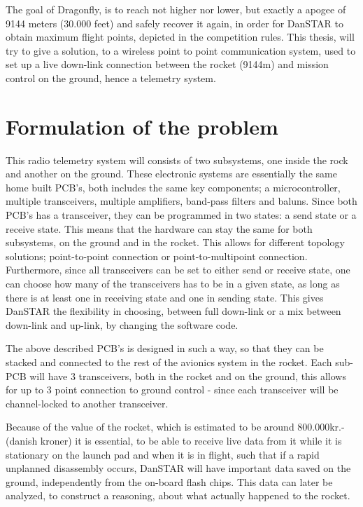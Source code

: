 
The goal of Dragonfly, is to reach not higher nor lower, but exactly a apogee of 9144 meters (30.000 feet) and safely recover it again, in order for DanSTAR to obtain maximum flight points, depicted in the competition rules\cite{SAC}. This thesis, will try to give a solution, to a wireless point to point communication system, used to set up a live down-link connection between the rocket (9144m) and mission control on the ground, hence a telemetry system. 

\newpage

\section{Formulation of the problem}
This radio telemetry system will consists of two subsystems, one inside the rock and another on the ground. These electronic systems are essentially the same home built PCB's, both includes the same key components; a microcontroller, multiple transceivers, multiple amplifiers, band-pass filters and baluns. Since both PCB's has a transceiver, they can be programmed in two states: a send state or a receive state. This means that the hardware can stay the same for both subsystems, on the ground and in the rocket. This allows for different topology solutions; point-to-point connection or point-to-multipoint connection. Furthermore, since all transceivers can be set to either send or receive state, one can choose how many of the transceivers has to be in a given state, as long as there is at least one in receiving state and one in sending state. This gives DanSTAR the flexibility in choosing, between full down-link or a mix between down-link and up-link, by changing the software code.
 
The above described PCB's is designed in such a way, so that they can be stacked and connected to the rest of the avionics system in the rocket. Each sub-PCB will have 3 transceivers, both in the rocket and on the ground, this allows for up to 3 point connection to ground control - since each transceiver will be channel-locked to another transceiver.

Because of the value of the rocket, which is estimated to be around 800.000kr.- (danish kroner) it is essential, to be able to receive live data from it while it is stationary on the launch pad and when it is in flight, such that if a rapid unplanned disassembly\cite{WikipediaRUD} occurs, DanSTAR will have important data saved on the ground, independently from the on-board flash chips. This data can later be analyzed, to construct a reasoning, about what actually happened to the rocket.

